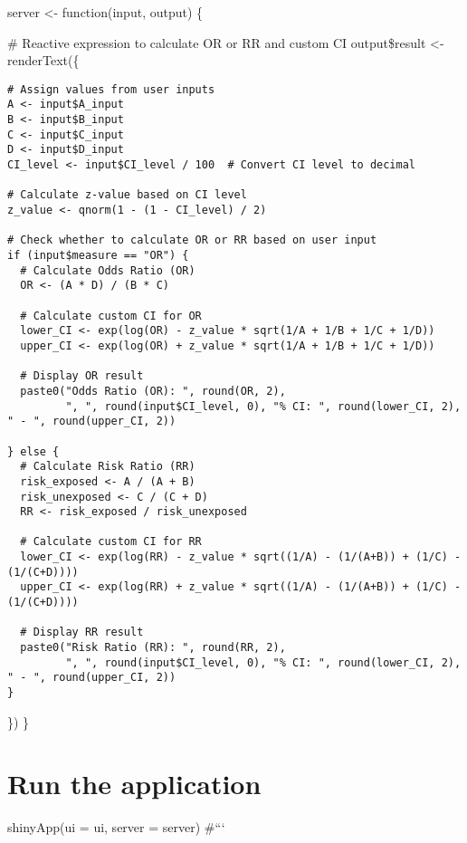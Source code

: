 \documentclass[
  letterpaper,
  paper=6in:9in,
  pagesize=pdftex,
  headinclude=on,
  footinclude=on,
  12pt]{scrbook}
\begin{document}
server \textless- function(input, output) \{

\# Reactive expression to calculate OR or RR and custom CI
output\$result \textless- renderText(\{

\begin{verbatim}
# Assign values from user inputs
A <- input$A_input
B <- input$B_input
C <- input$C_input
D <- input$D_input
CI_level <- input$CI_level / 100  # Convert CI level to decimal

# Calculate z-value based on CI level
z_value <- qnorm(1 - (1 - CI_level) / 2)

# Check whether to calculate OR or RR based on user input
if (input$measure == "OR") {
  # Calculate Odds Ratio (OR)
  OR <- (A * D) / (B * C)
  
  # Calculate custom CI for OR
  lower_CI <- exp(log(OR) - z_value * sqrt(1/A + 1/B + 1/C + 1/D))
  upper_CI <- exp(log(OR) + z_value * sqrt(1/A + 1/B + 1/C + 1/D))
  
  # Display OR result
  paste0("Odds Ratio (OR): ", round(OR, 2), 
         ", ", round(input$CI_level, 0), "% CI: ", round(lower_CI, 2), " - ", round(upper_CI, 2))
  
} else {
  # Calculate Risk Ratio (RR)
  risk_exposed <- A / (A + B)
  risk_unexposed <- C / (C + D)
  RR <- risk_exposed / risk_unexposed
  
  # Calculate custom CI for RR
  lower_CI <- exp(log(RR) - z_value * sqrt((1/A) - (1/(A+B)) + (1/C) - (1/(C+D))))
  upper_CI <- exp(log(RR) + z_value * sqrt((1/A) - (1/(A+B)) + (1/C) - (1/(C+D))))
  
  # Display RR result
  paste0("Risk Ratio (RR): ", round(RR, 2), 
         ", ", round(input$CI_level, 0), "% CI: ", round(lower_CI, 2), " - ", round(upper_CI, 2))
}
\end{verbatim}

\}) \}


\chapter{Run the application}\label{run-the-application}

shinyApp(ui = ui, server = server) \#```


\backmatter
\end{document}
